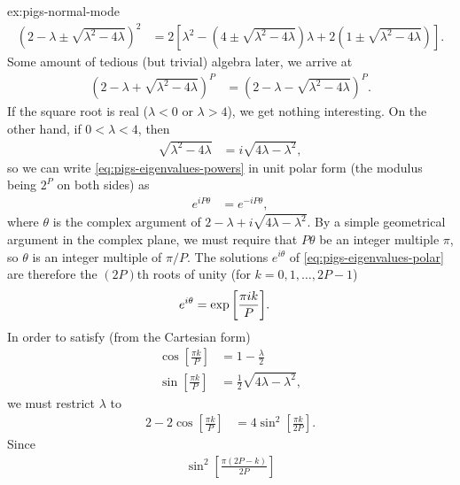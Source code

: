 \begin{DefAnswer}{ex:pigs-normal-mode}
	\begin{align}
		\left( 2 - \lambda \pm \sqrt{\lambda^2 - 4 \lambda} \right)^2
		&= 2 \left[ \lambda^2 - \left( 4 \pm \sqrt{\lambda^2 - 4 \lambda} \right) \lambda + 2 \left( 1 \pm \sqrt{\lambda^2 - 4 \lambda} \right) \right].
	\end{align}
	Some amount of tedious (but trivial) algebra later, we arrive at
	\begin{align}
		\left( 2 - \lambda + \sqrt{\lambda^2 - 4 \lambda} \right)^P
		&= \left( 2 - \lambda - \sqrt{\lambda^2 - 4 \lambda} \right)^P.
			\label{eq:pigs-eigenvalues-powers}
	\end{align}
	If the square root is real ($\lambda < 0$ or $\lambda > 4$), we get nothing interesting.
	On the other hand, if $0 < \lambda < 4$, then
	\begin{align}
		\sqrt{\lambda^2 - 4 \lambda}
		&= i \sqrt{4 \lambda - \lambda^2},
	\end{align}
	so we can write \cref{eq:pigs-eigenvalues-powers} in unit polar form (the modulus being $2^P$ on both sides) as
	\begin{align}
		e^{i P \theta}
		&= e^{-i P \theta},
			\label{eq:pigs-eigenvalues-polar}
	\end{align}
	where $\theta$ is the complex argument of $2 - \lambda + i \sqrt{4 \lambda - \lambda^2}$.
	By a simple geometrical argument in the complex plane, we must require that $P \theta$ be an integer multiple $\pi$, so $\theta$ is an integer multiple of $\pi / P$.
	The solutions $e^{i \theta}$ of \cref{eq:pigs-eigenvalues-polar} are therefore the $(2 P)$th roots of unity (for $k = 0, 1, \ldots, 2 P - 1$)
	\begin{align}
		e^{i \theta}
		&= \exp{\left[ \frac{\pi i k}{P} \right]}.
	\end{align}
	In order to satisfy (from the Cartesian form)
	\begin{subequations}
	\begin{align}
		\cos{\left[ \frac{\pi k}{P} \right]}
		&= 1 - \frac{\lambda}{2} \\
		\sin{\left[ \frac{\pi k}{P} \right]}
		&= \frac{1}{2} \sqrt{4 \lambda - \lambda^2},
	\end{align}
	\end{subequations}
	we must restrict $\lambda$ to
	\begin{align}
		2 - 2 \cos{\left[ \frac{\pi k}{P} \right]}
		&= 4 \sin^2{\left[ \frac{\pi k}{2 P} \right]}.
	\end{align}
	Since
	\begin{align}
		\sin^2{\left[ \frac{\pi (2 P - k)}{2 P} \right]}

\end{align}
\end{DefAnswer}
